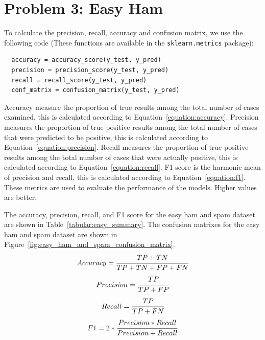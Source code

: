 \documentclass[a4paper]{article}
\begin{document}
\section*{Problem 3: Easy Ham}

To calculate the precision, recall, accuracy and confusion matrix, we use the following code (These functions are available in the \texttt{sklearn.metrics} package): 
\begin{verbatim}
  accuracy = accuracy_score(y_test, y_pred)
  precision = precision_score(y_test, y_pred)
  recall = recall_score(y_test, y_pred)
  conf_matrix = confusion_matrix(y_test, y_pred)
\end{verbatim}

Accuracy measure the proportion of true results among the total number of cases examined, this is calculated according to Equation~\ref{equation:accuracy}. 
Precision measures the proportion of true positive results among the total number of cases that were predicted to be positive, this is calculated according to Equation~\ref{equation:precision}. 
Recall measures the proportion of true positive results among the total number of cases that were actually positive, this is calculated according to Equation~\ref{equation:recall}.
F1 score is the harmonic mean of precision and recall, this is calculated according to Equation~\ref{equation:f1}.
These metrics are used to evaluate the performance of the models. Higher values are better.

The accuracy, precision, recall, and F1 score for the easy ham and spam dataset are shown in Table~\ref{tabular:easy_summary}. 
The confusion matrixes for the easy ham and spam dataset are shown in Figure~\ref{fig:easy_ham_and_spam_confusion_matrix}.
\begin{equation}
  \label{equation:accuracy}
  Accuracy =  \cfrac{ TP + TN}{TP + TN + FP + FN}  
\end{equation}
\begin{equation}
  \label{equation:precision}
  Precision = \cfrac{ TP}{TP + FP}  \\
\end{equation}
\begin{equation}
  \label{equation:recall}
  Recall = \cfrac{ TP}{TP + FN}  \\
\end{equation}
\begin{equation}
  \label{equation:f1}
  F1 = 2 * \cfrac{ Precision * Recall}{Precision + Recall}
\end{equation}
\end{document}
